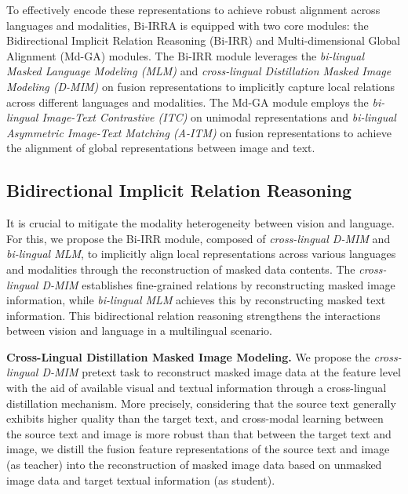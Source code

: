 \documentclass[10pt,journal,compsoc]{IEEEtran}
\begin{document}
To effectively encode these representations to achieve robust alignment across languages and modalities, Bi-IRRA is equipped with two core modules: the Bidirectional Implicit Relation Reasoning (Bi-IRR) and Multi-dimensional Global Alignment (Md-GA) modules. 
The Bi-IRR module leverages the \emph{bi-lingual Masked Language Modeling (MLM)} and \emph{cross-lingual Distillation Masked Image Modeling (D-MIM)} on fusion representations to implicitly capture local relations across different languages and modalities.
The Md-GA module employs the \emph{bi-lingual Image-Text Contrastive (ITC)} on unimodal representations and \emph{bi-lingual Asymmetric Image-Text Matching (A-ITM)} on fusion representations to achieve the alignment of global representations between image and text.

\subsection{Bidirectional Implicit Relation Reasoning}
It is crucial to mitigate the modality heterogeneity between vision and language. 
For this, we propose the Bi-IRR module, composed of \emph{cross-lingual D-MIM} and \emph{bi-lingual MLM}, to implicitly align local representations across various languages and modalities through the reconstruction of masked data contents.
The \emph{cross-lingual D-MIM} establishes fine-grained relations by reconstructing masked image information, while \emph{bi-lingual MLM} achieves this by reconstructing masked text information. This bidirectional relation reasoning strengthens the interactions between vision and language in a multilingual scenario.

\textbf{Cross-Lingual Distillation Masked Image Modeling.} 
We propose the \emph{cross-lingual D-MIM} pretext task to reconstruct masked image data at the feature level with the aid of available visual and textual information through a cross-lingual distillation mechanism.
More precisely, considering that the source text generally exhibits higher quality than the target text, and cross-modal learning between the source text and image is more robust than that between the target text and image, we distill the fusion feature representations of the source text and image (as teacher) into the reconstruction of masked image data based on unmasked image data and target textual information (as student). 

\end{document}
